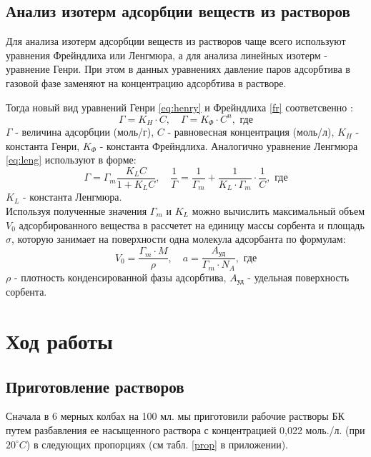 \documentclass[a4paper,12pt]{article} %
\begin{document}
\subsection*{Анализ изотерм адсорбции веществ из растворов}
Для анализа изотерм адсорбции веществ из растворов чаще всего используют уравнения Фрейндлиха или Ленгмюра, а для анализа линейных изотерм - уравнение Генри. При этом в данных уравнениях давление паров адсорбтива в газовой фазе заменяют на концентрацию адсорбтива в растворе.
\par
Тогда новый вид уравнений Генри \eqref{eq:henry} и Фрейндлиха \eqref{fr} соответсвенно :
\begin{equation}
    \Gamma = K_H\cdot C, \quad \Gamma = K_\Phi \cdot C^n, \textrm { где}
\end{equation}
$\Gamma$ - величина адсорбции (моль/г), 
\newline $C$ - равновесная концентрация (моль/л), 
\newline $K_H$ - константа Генри,
\newline $K_\Phi$ - константа Фрейндлиха.
\newline Аналогично уравнение Ленгмюра \eqref{eq:leng} используют в форме:
\begin{equation}
    \Gamma = \Gamma_m\dfrac{K_LC}{1 + K_LC}, \quad \dfrac{1}{\Gamma} = \dfrac{1}{\Gamma_m} + \dfrac{1}{K_L \cdot \Gamma_m} \cdot \dfrac{1}{C}, \textrm{ где}
\end{equation}
$K_L$ - константа Ленгмюра.
\\
Используя полученные значения $\Gamma_m$ и $K_L$ можно вычислить максимальный объем $V_0$ адсорбированного вещества в рассчетет на единицу массы сорбента и площадь $\sigma$, которую занимает на поверхности одна молекула адсорбанта по формулам:
\begin{equation}
    V_0 =\dfrac{\Gamma_m \cdot M}{\rho}, \quad  a =\dfrac{A_{\text{уд}}}{\Gamma_m \cdot N_A}, \textrm{ где}
\end{equation}
$\rho$ - плотность конденсированной фазы адсорбтива, \newline $A_\text{уд}$ - удельная поверхность сорбента.
    


\section*{Ход работы}
\subsection*{Приготовление растворов}
Сначала в 6 мерных колбах на 100 мл. мы приготовили рабочие растворы БК путем разбавления ее насыщенного раствора с концентрацией 0,022 моль./л. (при $20^{\circ} C$) в следующих пропорциях (см табл. \ref{prop} в приложении).
\end{document}
